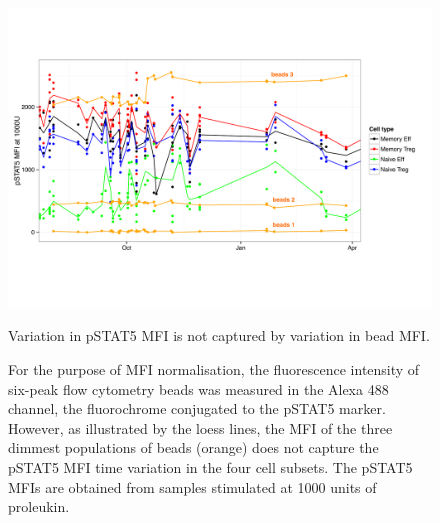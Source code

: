 \begin{figure}
\centering
\begin{minipage}{.8\textwidth}
\includegraphics[width=\linewidth]{figures/pstat5-beads}
\end{minipage}
\begin{minipage}{\textwidth}
{Variation in pSTAT5 MFI is not captured by variation in bead MFI.}
{
  For the purpose of MFI normalisation, the fluorescence intensity of six-peak flow cytometry beads
  was measured in the Alexa 488 channel, the fluorochrome conjugated to the pSTAT5 marker.
  However, as illustrated by the loess lines, the MFI of the three dimmest populations of beads (orange)
  does not capture the pSTAT5 MFI time variation in the four cell subsets.
  The pSTAT5 MFIs are obtained from samples stimulated at 1000 units of proleukin.
  
}
\end{minipage}
\end{figure}


